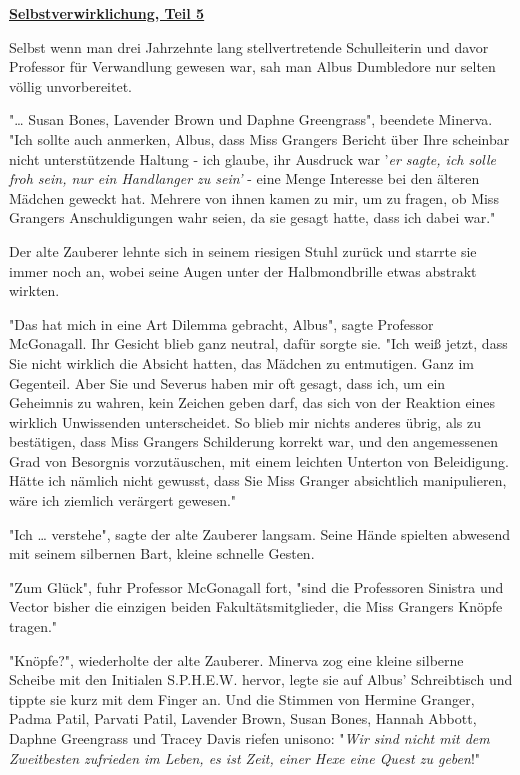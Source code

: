

\hypertarget{selbstverwirklichung-teil-5}{%

\textbf{\uline{Selbstverwirklichung, Teil 5}}

Selbst wenn man drei Jahrzehnte lang stellvertretende Schulleiterin und davor Professor für Verwandlung gewesen war, sah man Albus Dumbledore nur selten völlig unvorbereitet.

"… Susan Bones, Lavender Brown und Daphne Greengrass", beendete Minerva. "Ich sollte auch anmerken, Albus, dass Miss Grangers Bericht über Ihre scheinbar nicht unterstützende Haltung - ich glaube, ihr Ausdruck war '\emph{er sagte, ich solle froh sein, nur ein Handlanger zu sein'} - eine Menge Interesse bei den älteren Mädchen geweckt hat. Mehrere von ihnen kamen zu mir, um zu fragen, ob Miss Grangers Anschuldigungen wahr seien, da sie gesagt hatte, dass ich dabei war."

Der alte Zauberer lehnte sich in seinem riesigen Stuhl zurück und starrte sie immer noch an, wobei seine Augen unter der Halbmondbrille etwas abstrakt wirkten.

"Das hat mich in eine Art Dilemma gebracht, Albus", sagte Professor McGonagall. Ihr Gesicht blieb ganz neutral, dafür sorgte sie. "Ich weiß jetzt, dass Sie nicht wirklich die Absicht hatten, das Mädchen zu entmutigen. Ganz im Gegenteil. Aber Sie und Severus haben mir oft gesagt, dass ich, um ein Geheimnis zu wahren, kein Zeichen geben darf, das sich von der Reaktion eines wirklich Unwissenden unterscheidet. So blieb mir nichts anderes übrig, als zu bestätigen, dass Miss Grangers Schilderung korrekt war, und den angemessenen Grad von Besorgnis vorzutäuschen, mit einem leichten Unterton von Beleidigung. Hätte ich nämlich nicht gewusst, dass Sie Miss Granger absichtlich manipulieren, wäre ich ziemlich verärgert gewesen."

"Ich … verstehe", sagte der alte Zauberer langsam. Seine Hände spielten abwesend mit seinem silbernen Bart, kleine schnelle Gesten.

"Zum Glück", fuhr Professor McGonagall fort, "sind die Professoren Sinistra und Vector bisher die einzigen beiden Fakultätsmitglieder, die Miss Grangers Knöpfe tragen."

"Knöpfe?", wiederholte der alte Zauberer. Minerva zog eine kleine silberne Scheibe mit den Initialen S.P.H.E.W. hervor, legte sie auf Albus' Schreibtisch und tippte sie kurz mit dem Finger an. Und die Stimmen von Hermine Granger, Padma Patil, Parvati Patil, Lavender Brown, Susan Bones, Hannah Abbott, Daphne Greengrass und Tracey Davis riefen unisono: "\emph{Wir sind nicht mit dem Zweitbesten zufrieden im Leben, es ist Zeit, einer Hexe eine Quest zu geben}!"

}
